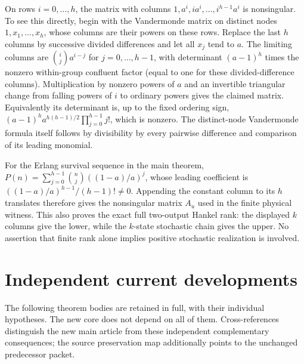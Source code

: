 On rows $i=0,\ldots,h$, the matrix with columns $1,a^i,i a^i,\ldots,i^{h-1}a^i$ is nonsingular. To see this directly, begin with the Vandermonde matrix on distinct nodes $1,x_1,\ldots,x_h$, whose columns are their powers on these rows. Replace the last $h$ columns by successive divided differences and let all $x_j$ tend to $a$. The limiting columns are $\binom{i}{j}a^{i-j}$ for $j=0,\ldots,h-1$, with determinant $(a-1)^h$ times the nonzero within-group confluent factor (equal to one for these divided-difference columns). Multiplication by nonzero powers of $a$ and an invertible triangular change from falling powers of $i$ to ordinary powers gives the claimed matrix. Equivalently its determinant is, up to the fixed ordering sign, $(a-1)^h a^{h(h-1)/2}\prod_{j=0}^{h-1}j!$, which is nonzero. The distinct-node Vandermonde formula itself follows by divisibility by every pairwise difference and comparison of its leading monomial.

For the Erlang survival sequence in the main theorem,
$P(n)=\sum_{j=0}^{h-1}\binom{n}{j}((1-a)/a)^j$,
whose leading coefficient is $((1-a)/a)^{h-1}/(h-1)!\ne0$. Appending the constant column to its $h$ translates therefore gives the nonsingular matrix $A_u$ used in the finite physical witness. This also proves the exact full two-output Hankel rank: the displayed $k$ columns give the lower, while the $k$-state stochastic chain gives the upper. No assertion that finite rank alone implies positive stochastic realization is involved.

\section*{Independent current developments}
The following theorem bodies are retained in full, with their individual hypotheses. The new core does not depend on all of them. Cross-references distinguish the new main article from these independent complementary consequences; the source preservation map additionally points to the unchanged predecessor packet.

























